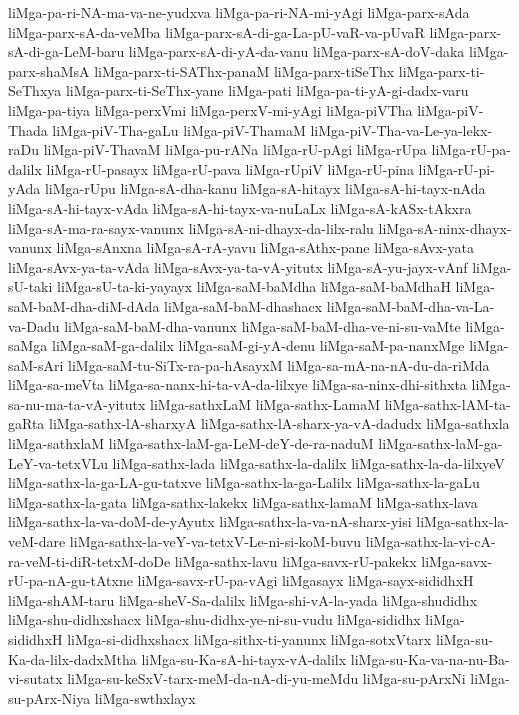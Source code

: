 {liMga-pa-ri-NA-ma-va-ne-yudxva
liMga-pa-ri-NA-mi-yAgi
liMga-parx-sAda
liMga-parx-sA-da-veMba
liMga-parx-sA-di-ga-La-pU-vaR-va-pUvaR
liMga-parx-sA-di-ga-LeM-baru
liMga-parx-sA-di-yA-da-vanu
liMga-parx-sA-doV-daka
liMga-parx-shaMsA
liMga-parx-ti-SAThx-panaM
liMga-parx-tiSeThx
liMga-parx-ti-SeThxya
liMga-parx-ti-SeThx-yane
liMga-pati
liMga-pa-ti-yA-gi-dadx-varu
liMga-pa-tiya
liMga-perxVmi
liMga-perxV-mi-yAgi
liMga-piVTha
liMga-piV-Thada
liMga-piV-Tha-gaLu
liMga-piV-ThamaM
liMga-piV-Tha-va-Le-ya-lekx-raDu
liMga-piV-ThavaM
liMga-pu-rANa
liMga-rU-pAgi
liMga-rUpa
liMga-rU-pa-dalilx
liMga-rU-pasayx
liMga-rU-pava
liMga-rUpiV
liMga-rU-pina
liMga-rU-pi-yAda
liMga-rUpu
liMga-sA-dha-kanu
liMga-sA-hitayx
liMga-sA-hi-tayx-nAda
liMga-sA-hi-tayx-vAda
liMga-sA-hi-tayx-va-nuLaLx
liMga-sA-kASx-tAkxra
liMga-sA-ma-ra-sayx-vanunx
liMga-sA-ni-dhayx-da-lilx-ralu
liMga-sA-ninx-dhayx-vanunx
liMga-sAnxna
liMga-sA-rA-yavu
liMga-sAthx-pane
liMga-sAvx-yata
liMga-sAvx-ya-ta-vAda
liMga-sAvx-ya-ta-vA-yitutx
liMga-sA-yu-jayx-vAnf
liMga-sU-taki
liMga-sU-ta-ki-yayayx
liMga-saM-baMdha
liMga-saM-baMdhaH
liMga-saM-baM-dha-diM-dAda
liMga-saM-baM-dhashacx
liMga-saM-baM-dha-va-La-va-Dadu
liMga-saM-baM-dha-vanunx
liMga-saM-baM-dha-ve-ni-su-vaMte
liMga-saMga
liMga-saM-ga-dalilx
liMga-saM-gi-yA-denu
liMga-saM-pa-nanxMge
liMga-saM-sAri
liMga-saM-tu-SiTx-ra-pa-hAsayxM
liMga-sa-mA-na-nA-du-da-riMda
liMga-sa-meVta
liMga-sa-nanx-hi-ta-vA-da-lilxye
liMga-sa-ninx-dhi-sithxta
liMga-sa-nu-ma-ta-vA-yitutx
liMga-sathxLaM
liMga-sathx-LamaM
liMga-sathx-lAM-ta-gaRta
liMga-sathx-lA-sharxyA
liMga-sathx-lA-sharx-ya-vA-dadudx
liMga-sathxla
liMga-sathxlaM
liMga-sathx-laM-ga-LeM-deY-de-ra-naduM
liMga-sathx-laM-ga-LeY-va-tetxVLu
liMga-sathx-lada
liMga-sathx-la-dalilx
liMga-sathx-la-da-lilxyeV
liMga-sathx-la-ga-LA-gu-tatxve
liMga-sathx-la-ga-Lalilx
liMga-sathx-la-gaLu
liMga-sathx-la-gata
liMga-sathx-lakekx
liMga-sathx-lamaM
liMga-sathx-lava
liMga-sathx-la-va-doM-de-yAyutx
liMga-sathx-la-va-nA-sharx-yisi
liMga-sathx-la-veM-dare
liMga-sathx-la-veY-va-tetxV-Le-ni-si-koM-buvu
liMga-sathx-la-vi-cA-ra-veM-ti-diR-tetxM-doDe
liMga-sathx-lavu
liMga-savx-rU-pakekx
liMga-savx-rU-pa-nA-gu-tAtxne
liMga-savx-rU-pa-vAgi
liMgasayx
liMga-sayx-sididhxH
liMga-shAM-taru
liMga-sheV-Sa-dalilx
liMga-shi-vA-la-yada
liMga-shudidhx
liMga-shu-didhxshacx
liMga-shu-didhx-ye-ni-su-vudu
liMga-sididhx
liMga-sididhxH
liMga-si-didhxshacx
liMga-sithx-ti-yanunx
liMga-sotxVtarx
liMga-su-Ka-da-lilx-dadxMtha
liMga-su-Ka-sA-hi-tayx-vA-dalilx
liMga-su-Ka-va-na-nu-Ba-vi-sutatx
liMga-su-keSxV-tarx-meM-da-nA-di-yu-meMdu
liMga-su-pArxNi
liMga-su-pArx-Niya
liMga-swthxlayx
}
